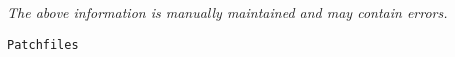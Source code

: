 \label{pkg:patchfiles}

{\tiny \it The above information is manually maintained and may contain errors.}
\begin{verbatim}
Patchfiles
\end{verbatim}
